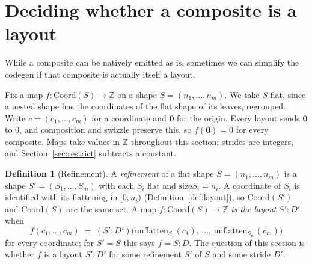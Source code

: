 \documentclass[11pt]{article}
\theoremstyle{definition}
\newtheorem{definition}{Definition}
\newcommand{\size}{\mathrm{size}}
\newcommand{\Z}{\mathbb{Z}}
\begin{document}
\begin{description}
\end{description}

\section{Deciding whether a composite is a layout}\label{sec:decide}

While a composite can be natively emitted as is, sometimes we can simplify the codegen
if that composite is actually itself a layout.

Fix a map $f : \mathrm{Coord}(S) \to \Z$ on a shape $S = (n_1,\dots,n_m)$.
We take $S$ flat, since a nested shape has the coordinates of the flat shape
of its leaves, regrouped. Write $c = (c_1,\dots,c_m)$ for a coordinate and
$\mathbf{0}$ for the origin. Every layout sends $\mathbf{0}$ to $0$, and
composition and swizzle preserve this, so $f(\mathbf{0}) = 0$ for every
composite. Maps take values in $\Z$ throughout this section: strides are
integers, and Section~\ref{sec:restrict} subtracts a constant.

\begin{definition}[Refinement]\label{def:refine}
A \emph{refinement} of a flat shape $S = (n_1,\dots,n_m)$ is a shape
$S' = (S_1,\dots,S_m)$ with each $S_i$ flat and $\size S_i = n_i$. A
coordinate of $S_i$ is identified with its flattening in $[0,n_i)$
(Definition~\ref{def:layout}), so $\mathrm{Coord}(S')$ and $\mathrm{Coord}(S)$
are the same set. A map $f : \mathrm{Coord}(S) \to \Z$ \emph{is the layout}
$S'{:}D'$ when
\[
f(c_1,\dots,c_m) \;=\;
(S'{:}D')\big(\mathrm{unflatten}_{S_1}(c_1),\,\dots,\,\mathrm{unflatten}_{S_m}(c_m)\big)
\]
for every coordinate; for $S' = S$ this says $f = S{:}D$. The question of
this section is whether $f$ is a layout $S'{:}D'$ for some refinement $S'$ of
$S$ and some stride $D'$.
\end{definition}
\end{document}
